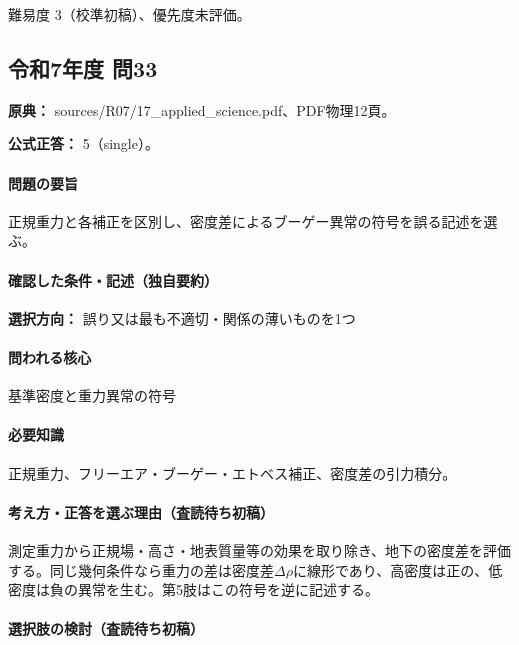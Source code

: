 \par 難易度 3（校準初稿）、優先度未評価。

\subsection{令和7年度 問33}
\label{q:r07-reg-applied-33}

\noindent\textbf{原典：} sources/R07/17\_applied\_science.pdf、PDF物理12頁。

\textbf{公式正答：} 5（single）。

\paragraph{問題の要旨} 正規重力と各補正を区別し、密度差によるブーゲー異常の符号を誤る記述を選ぶ。

\paragraph{確認した条件・記述（独自要約）}\mbox{}\par

\noindent\textbf{選択方向：} 誤り又は最も不適切・関係の薄いものを1つ\par

\paragraph{問われる核心} 基準密度と重力異常の符号

\paragraph{必要知識} 正規重力、フリーエア・ブーゲー・エトベス補正、密度差の引力積分。

\paragraph{考え方・正答を選ぶ理由（査読待ち初稿）} 測定重力から正規場・高さ・地表質量等の効果を取り除き、地下の密度差を評価する。同じ幾何条件なら重力の差は密度差\(\Delta\rho\)に線形であり、高密度は正の、低密度は負の異常を生む。第5肢はこの符号を逆に記述する。

\paragraph{選択肢の検討（査読待ち初稿）}\mbox{}\par


